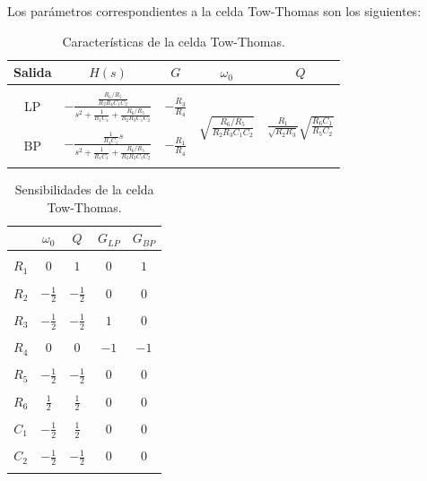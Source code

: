 Los par\'ametros correspondientes a la celda Tow-Thomas son los siguientes:


\begin{table}[h!]
	\centering
	\begin{tabular}{c c c c c}
		Salida & $H(s)$ & $G$ & $\omega_0$ & $Q$\\
		\hline \\
		LP & $-\frac{\frac{R_6/R_5}{R_2R_4C_1C_2}}{s^2+\frac{1}{R_1C_1}+\frac{R_6/R_5}{R_2R_3C_1C_2}}$& $- \frac{R_3}{R_4}$& \multirow{4}{*}{$\sqrt{\frac{R_6/R_5}{R_2R_3C_1C_2}}$}&
		\multirow{4}{*}{$\frac{R_1}{\sqrt{R_2R_3}}\sqrt{\frac{R_6C_1}{R_5C_2}}$}\\ \\
		BP & $-\frac{\frac{1}{R_4 C_1}s}{s^2+\frac{1}{R_1C_1}+\frac{R_6/R_5}{R_2R_3C_1C_2}}$&$-\frac{R_1}{R_4}$& &\\ \\
		\hline
	\end{tabular}
	\caption{Caracter\'isticas de la celda Tow-Thomas.}
	\label{hg_tt}
\end{table}

\begin{table}[h!]
	\centering
	\begin{tabular}{c c c c c }
		& $\omega_0$ & $Q$ &$G_{LP}$ & $G_{BP}$\\
		\hline \\
		$R_1$ & $0$& $1$ & $0$& $1$\\ \\
		$R_2$ & $-\frac{1}{2}$& $-\frac{1}{2}$ & $0$& $0$\\ \\
		$R_3$ & $-\frac{1}{2}$& $-\frac{1}{2}$ & $1$&$0$ \\ \\
		$R_4$ & $0$& $0$& $-1$ &$-1$ \\ \\
		$R_5$ & $-\frac{1}{2}$&$-\frac{1}{2}$ & $0$&$0$ \\ \\
		$R_6$ & $\frac{1}{2}$& $\frac{1}{2}$ & $0$& $0$ \\ \\
		$C_1$ & $-\frac{1}{2}$& $\frac{1}{2}$ & $0$& $0$\\ \\
		$C_2$ & $-\frac{1}{2}$& $-\frac{1}{2}$ & $0$ & $0$\\ \\
		\hline
	\end{tabular}
	\caption{Sensibilidades de la celda Tow-Thomas.}
	\label{sens_tt}
\end{table}


